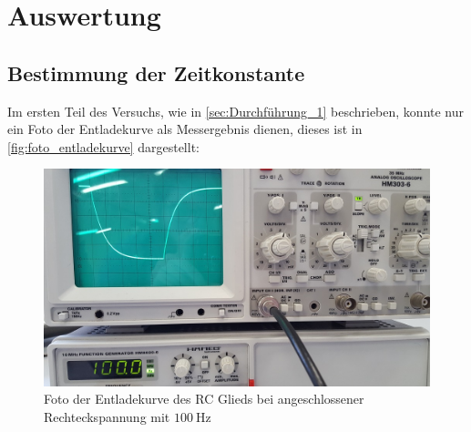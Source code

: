 \section{Auswertung}
\label{sec:Auswertung}



\subsection{Bestimmung der Zeitkonstante}
\label{sec:Auswertung_Zeitkonstante}

Im ersten Teil des Versuchs, wie in \autoref{sec:Durchführung_1} beschrieben, konnte nur ein Foto der Entladekurve als Messergebnis dienen, dieses ist in \autoref{fig:foto_entladekurve} dargestellt:

\begin{figure}
    \centering
    \includegraphics[width=\textwidth]{images/foto_01.jpg}
    \caption{Foto der Entladekurve des RC Glieds bei angeschlossener Rechteckspannung mit $\SI{100}{\hertz}$}
    \label{fig:foto_entladekurve}
\end{figure}

